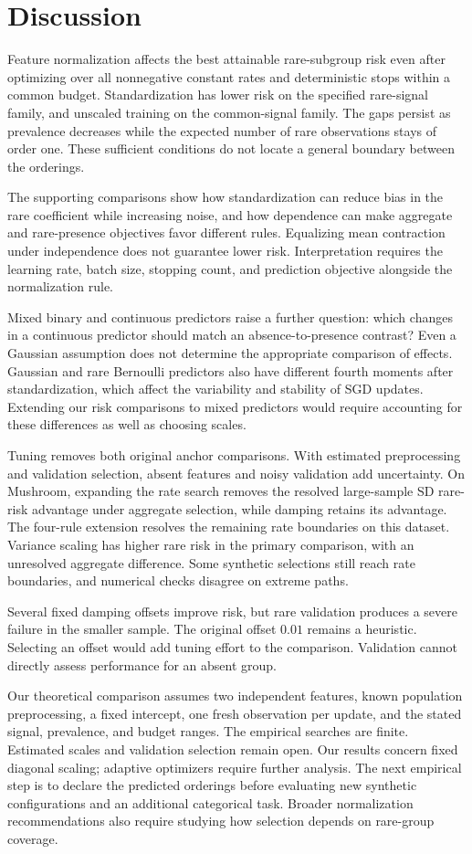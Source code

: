 \section{Discussion}

Feature normalization affects the best attainable rare-subgroup risk even after
optimizing over all nonnegative constant rates and deterministic stops within a
common budget. Standardization has lower risk on the specified rare-signal
family, and unscaled training on the common-signal family. The gaps persist as
prevalence decreases while the expected number of rare observations stays of
order one. These sufficient conditions do not locate a general boundary between
the orderings.

The supporting comparisons show how standardization can reduce bias in the rare
coefficient while increasing noise, and how dependence can make aggregate and
rare-presence objectives favor different rules. Equalizing mean contraction
under independence does not guarantee lower risk. Interpretation requires the
learning rate, batch size, stopping count, and prediction objective alongside
the normalization rule.

Mixed binary and continuous predictors raise a further question: which changes
in a continuous predictor should match an absence-to-presence contrast? Even a
Gaussian assumption does not determine the appropriate comparison of effects.
Gaussian and rare Bernoulli predictors also have different fourth moments after
standardization, which affect the variability and stability of SGD updates.
Extending our risk comparisons to mixed predictors would require accounting for
these differences as well as choosing scales.

Tuning removes both original anchor comparisons. With estimated preprocessing
and validation selection, absent features and noisy validation add uncertainty.
On Mushroom, expanding the rate search removes the resolved large-sample SD
rare-risk advantage under aggregate selection, while damping retains its
advantage. The four-rule extension resolves the remaining rate boundaries on
this dataset. Variance scaling has higher rare risk in the primary comparison,
with an unresolved aggregate difference. Some synthetic selections still reach
rate boundaries, and numerical checks disagree on extreme paths.

Several fixed damping offsets improve risk, but rare validation produces a
severe failure in the smaller sample. The original offset $0.01$ remains a
heuristic. Selecting an offset would add tuning effort to the comparison.
Validation cannot directly assess performance for an absent group.

Our theoretical comparison assumes two independent features, known population
preprocessing, a fixed intercept, one fresh observation per update, and the
stated signal, prevalence, and budget ranges. The empirical searches are finite.
Estimated scales and validation selection remain open. Our results concern fixed
diagonal scaling; adaptive optimizers require further analysis. The next
empirical step is to declare the predicted orderings before
evaluating new synthetic configurations and an additional categorical task.
Broader normalization recommendations also require studying how selection
depends on rare-group coverage.
